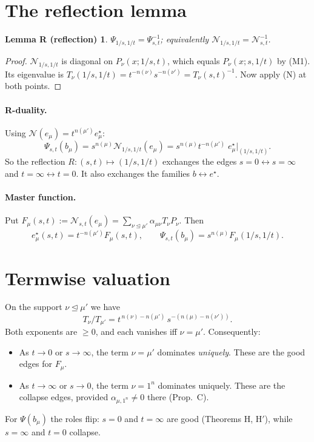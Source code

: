 \documentclass[11pt]{article}
\newtheorem*{lemmaR}{Lemma R (reflection)}
\theoremstyle{definition}
\newcommand{\cN}{\mathcal{N}}
\newcommand{\domd}{\trianglelefteq}
\begin{document}
\section{The reflection lemma}

\begin{lemmaR}
$\Psi_{1/s,1/t}=\Psi_{s,t}^{-1}$; equivalently $\cN_{1/s,1/t}=\cN_{s,t}^{-1}$.
\end{lemmaR}
\begin{proof}
$\cN_{1/s,1/t}$ is diagonal on $P_\nu(x;1/s,t)$, which equals $P_\nu(x;s,1/t)$ by (M1). Its eigenvalue is $T_\nu(1/s,1/t)=t^{-n(\nu)}s^{-n(\nu')}=T_\nu(s,t)^{-1}$. Now apply (N) at both points.
\end{proof}

\paragraph{R-duality.} Using $\cN(e_\mu)=t^{n(\mu')}e^\star_\mu$:
\[
\Psi_{s,t}(b_\mu)=s^{n(\mu)}\cN_{1/s,1/t}(e_\mu)=s^{n(\mu)}t^{-n(\mu')}\;e^\star_\mu\big|_{(1/s,1/t)}.
\]
So the reflection $R:(s,t)\mapsto(1/s,1/t)$ exchanges the edges $s=0\leftrightarrow s=\infty$ and $t=\infty\leftrightarrow t=0$. It also exchanges the families $b\leftrightarrow e^\star$.

\paragraph{Master function.} Put $F_\mu(s,t):=\cN_{s,t}(e_\mu)=\sum_{\nu\domd\mu'}\alpha_{\mu\nu}T_\nu P_\nu$. Then
\[
e^\star_\mu(s,t)=t^{-n(\mu')}F_\mu(s,t),\qquad \Psi_{s,t}(b_\mu)=s^{n(\mu)}F_\mu(1/s,1/t).
\]

\section{Termwise valuation}

On the support $\nu\domd\mu'$ we have
\[
T_\nu/T_{\mu'}=t^{\,n(\nu)-n(\mu')}\,s^{-(n(\mu)-n(\nu'))}.
\]
Both exponents are $\ge0$, and each vanishes iff $\nu=\mu'$. Consequently:
\begin{itemize}[nosep]
\item As $t\to0$ or $s\to\infty$, the term $\nu=\mu'$ dominates \emph{uniquely}. These are the good edges for $F_\mu$.
\item As $t\to\infty$ or $s\to0$, the term $\nu=1^n$ dominates uniquely. These are the collapse edges, provided $\alpha_{\mu,1^n}\neq0$ there (Prop.~C).
\end{itemize}
For $\Psi(b_\mu)$ the roles flip: $s=0$ and $t=\infty$ are good (Theorems H, H$'$), while $s=\infty$ and $t=0$ collapse.
\end{document}
